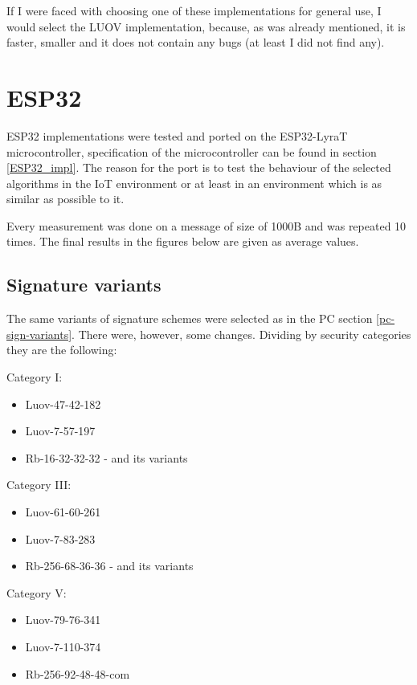 \documentclass[thesis=M,english]{FITthesis}[2019/12/23]
\begin{document}
\bigskip
\noindent
If I were faced with choosing one of these implementations for general use, I would select the LUOV implementation, because, as was already mentioned, it is faster, smaller and it does not contain any bugs (at least I did not find any). 

\newpage
\section{ESP32}
ESP32 implementations were tested and ported on the ESP32-LyraT microcontroller, specification of the microcontroller can be found in section \ref{ESP32_impl}. The reason for the port is to test the behaviour of the selected algorithms in the IoT environment or at least in an environment which is as similar as possible to it.

\bigskip
\noindent
Every measurement was done on a message of size of 1000B and was repeated 10 times. The final results in the figures below are given as average values.

\subsection{Signature variants}
The same variants of signature schemes were selected as in the PC section \ref{pc-sign-variants}. There were, however, some changes. Dividing by security categories they are the following: 

\bigskip
\noindent
Category I:
\begin{itemize}
\item Luov-47-42-182
\item Luov-7-57-197
\item Rb-16-32-32-32 - and its variants
\end{itemize}

\noindent
Category III:
\begin{itemize}
\item Luov-61-60-261
\item Luov-7-83-283
\item Rb-256-68-36-36 - and its variants
\end{itemize}

\noindent
Category V:
\begin{itemize}
\item Luov-79-76-341
\item Luov-7-110-374
\item Rb-256-92-48-48-com
\end{itemize}
\end{document}
